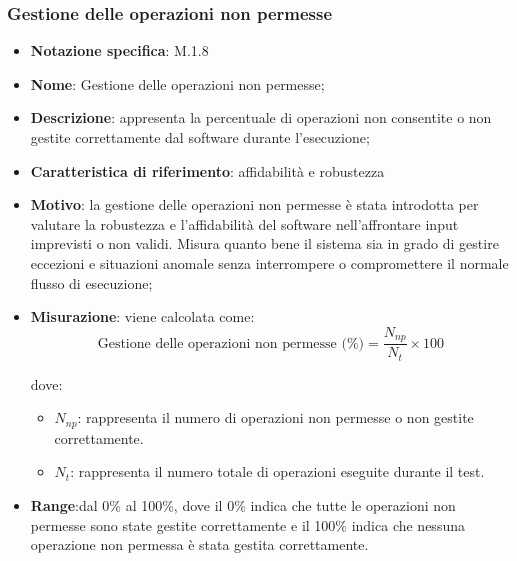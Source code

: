 \subsubsection{Gestione delle operazioni non permesse}
\begin{itemize}
    \item \textbf{Notazione specifica}: M.1.8
    \item \textbf{Nome}:  Gestione delle operazioni non permesse;
    \item \textbf{Descrizione}: appresenta la percentuale di operazioni non consentite o non gestite correttamente dal software durante l'esecuzione;
    \item \textbf{Caratteristica di riferimento}: affidabilità e robustezza 
    \item \textbf{Motivo}: la gestione delle operazioni non permesse è stata introdotta per valutare la robustezza e l'affidabilità del software nell'affrontare input imprevisti o non validi. Misura quanto bene il sistema sia in grado di gestire eccezioni e situazioni anomale senza interrompere o compromettere il normale flusso di esecuzione;
    \item \textbf{Misurazione}: viene calcolata come:
    \[
    \text{Gestione delle operazioni non permesse (\%)} = \frac{N_{np}}{N_{t}} \times 100
    \]
    
    dove:
    
    \begin{itemize}
        \item $N_{np}$: rappresenta il numero di operazioni non permesse o non gestite correttamente.
        \item $N_{t}$: rappresenta il numero totale di operazioni eseguite durante il test.
    \end{itemize}
    \item \textbf{Range}:dal 0\% al 100\%, dove il 0\% indica che tutte le operazioni non permesse sono state gestite correttamente e il 100\% indica che nessuna operazione non permessa è stata gestita correttamente.
\end{itemize}